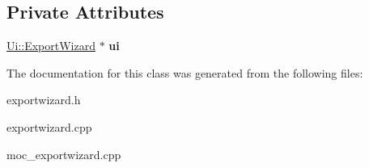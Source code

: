 \subsection*{Private Attributes}
\begin{DoxyCompactItemize}
\item 
\hypertarget{class_export_wizard_aa041ae21b502041f8030f492dae16186}{}\hyperlink{class_ui_1_1_export_wizard}{Ui\+::\+Export\+Wizard} $\ast$ {\bfseries ui}\label{class_export_wizard_aa041ae21b502041f8030f492dae16186}

\end{DoxyCompactItemize}


The documentation for this class was generated from the following files\+:\begin{DoxyCompactItemize}
\item 
exportwizard.\+h\item 
exportwizard.\+cpp\item 
moc\+\_\+exportwizard.\+cpp\end{DoxyCompactItemize}
